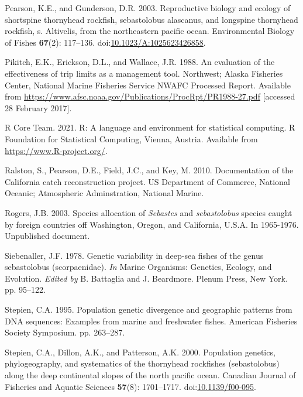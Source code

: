 \documentclass[11pt,
  english,
  letterpaper,
]{article}
\newlength{\cslhangindent}
\newenvironment{CSLReferences}[2] %
 {%
  \setlength{\parindent}{0pt}
  \ifodd #1 \everypar{\setlength{\hangindent}{\cslhangindent}}\ignorespaces\fi
  \ifnum #2 > 0
  \setlength{\parskip}{#2\baselineskip}
  \fi
 }%
 {}
\begin{document}
\begin{CSLReferences}{1}{0}
\leavevmode{}%
Pearson, K.E., and Gunderson, D.R. 2003. Reproductive biology and ecology of shortspine thornyhead rockfish, sebastolobus alascanus, and longspine thornyhead rockfish, s. Altivelis, from the northeastern pacific ocean. Environmental Biology of Fishes \textbf{67}(2): 117--136. doi:\href{https://doi.org/10.1023/A:1025623426858}{10.1023/A:1025623426858}.

\leavevmode{}%
Pikitch, E.K., Erickson, D.L., and Wallace, J.R. 1988. An evaluation of the effectiveness of trip limits as a management tool. Northwest; Alaska Fisheries Center, National Marine Fisheries Service NWAFC Processed Report. Available from \url{https://www.afsc.noaa.gov/Publications/ProcRpt/PR1988-27.pdf} {[}accessed 28 February 2017{]}.

\leavevmode{}%
R Core Team. 2021. R: A language and environment for statistical computing. R Foundation for Statistical Computing, Vienna, Austria. Available from \url{https://www.R-project.org/}.

\leavevmode{}%
Ralston, S., Pearson, D.E., Field, J.C., and Key, M. 2010. Documentation of the {California} catch reconstruction project. US Department of Commerce, National Oceanic; Atmospheric Adminstration, National Marine.

\leavevmode{}%
Rogers, J.B. 2003. Species allocation of \emph{{Sebastes}} and \emph{sebastolobus} species caught by foreign countries off {Washington}, {Oregon}, and {California}, {U}.{S}.{A}. In 1965-1976. Unpublished document.

\leavevmode{}%
Siebenaller, J.F. 1978. Genetic variability in deep-sea fishes of the genus sebastolobus (scorpaenidae). \emph{In} Marine Organisms: Genetics, Ecology, and Evolution. \emph{Edited by} B. Battaglia and J. Beardmore. Plenum Press, New York. pp. 95--122.

\leavevmode{}%
Stepien, C.A. 1995. Population genetic divergence and geographic patterns from DNA sequences: Examples from marine and freshwater fishes. American Fisheries Society Symposium. pp. 263--287.

\leavevmode{}%
Stepien, C.A., Dillon, A.K., and Patterson, A.K. 2000. Population genetics, phylogeography, and systematics of the thornyhead rockfishes (sebastolobus) along the deep continental slopes of the north pacific ocean. Canadian Journal of Fisheries and Aquatic Sciences \textbf{57}(8): 1701--1717. doi:\href{https://doi.org/10.1139/f00-095}{10.1139/f00-095}.


\end{CSLReferences}
\end{document}
